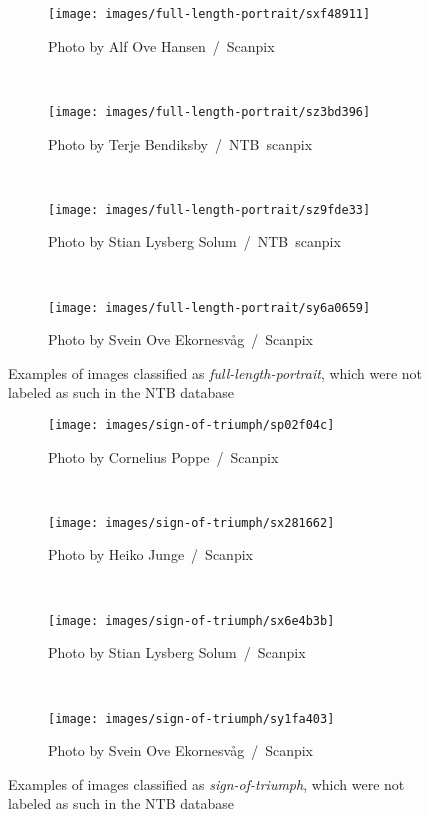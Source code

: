     \begin{figure}[h!]
        \centering
        \begin{subfigure}[a]{0.31\textwidth}
            \texttt{[image: images/full-length-portrait/sxf48911]}
            \caption{Photo by Alf Ove Hansen~/~Scanpix}
        \end{subfigure}
        ~
        \begin{subfigure}[a]{0.31\textwidth}
            \texttt{[image: images/full-length-portrait/sz3bd396]}
            \caption{Photo by Terje Bendiksby~/~NTB~scanpix}
        \end{subfigure}
        \\
        \begin{subfigure}[a]{0.31\textwidth}
            \texttt{[image: images/full-length-portrait/sz9fde33]}
            \caption{Photo by Stian Lysberg Solum~/~NTB~scanpix}
        \end{subfigure}
        ~
        \begin{subfigure}[a]{0.31\textwidth}
            \texttt{[image: images/full-length-portrait/sy6a0659]}
            \caption{Photo by Svein Ove Ekornesvåg~/~Scanpix}
        \end{subfigure}
        \caption[Main experiment. Examples of images classified as \textit{full-length-portrait}, which were not labeled as such in the NTB database]{Examples of images classified as \textit{full-length-portrait}, which were not labeled as such in the NTB database}
        \label{fig:main-wrong-flp}
    \end{figure}
    
    \begin{figure}[h!]
        \centering
        \begin{subfigure}[a]{0.31\textwidth}
            \texttt{[image: images/sign-of-triumph/sp02f04c]}
            \caption{Photo by Cornelius Poppe~/~Scanpix}
        \end{subfigure}
        ~
        \begin{subfigure}[a]{0.31\textwidth}
            \texttt{[image: images/sign-of-triumph/sx281662]}
            \caption{Photo by Heiko Junge~/~Scanpix}
        \end{subfigure}
        \\
        \begin{subfigure}[a]{0.31\textwidth}
            \texttt{[image: images/sign-of-triumph/sx6e4b3b]}
            \caption{Photo by Stian Lysberg Solum~/~Scanpix}
        \end{subfigure}
        ~
        \begin{subfigure}[a]{0.31\textwidth}
            \texttt{[image: images/sign-of-triumph/sy1fa403]}
            \caption{Photo by Svein Ove Ekornesvåg~/~Scanpix}
        \end{subfigure}
        \caption[Main experiment. Examples of images classified as \textit{sign-of-triumph}, which were not labeled as such in the NTB database]{Examples of images classified as \textit{sign-of-triumph}, which were not labeled as such in the NTB database}
        \label{fig:main-wrong-sot}
    \end{figure}